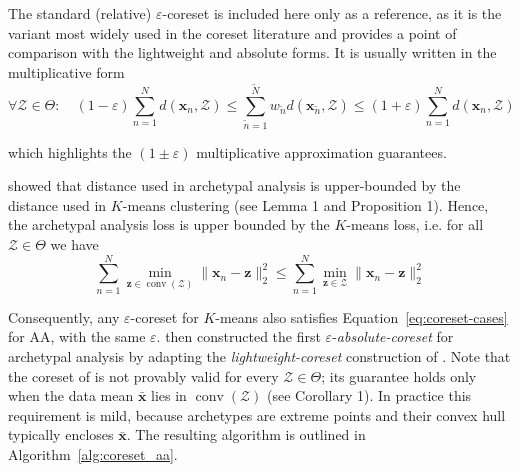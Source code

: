 \documentclass[oneside]{article}
\begin{document}
The standard (relative) $\varepsilon$-coreset is included here only as a reference, as it is the variant most widely used in the coreset literature and provides a point of comparison with the lightweight and absolute forms.  It is usually written in the multiplicative form
\begin{equation}
    \forall \mathcal{Z} \in \Theta: \quad (1-\varepsilon) \sum_{n=1}^N d(\mathbf{x}_n, \mathcal{Z}) \leq \sum_{\tilde{n}=1}^{\tilde{N}} w_{\tilde{n}} d(\mathbf{x}_{\tilde{n}}, \mathcal{Z}) \leq (1+\varepsilon)  \sum_{n=1}^N d(\mathbf{x}_n, \mathcal{Z})
\end{equation}

which highlights the $(1 \pm \varepsilon)$ multiplicative approximation guarantees.

\textcite{mairCoresetsArchetypalAnalysis2019} showed that distance used in archetypal analysis is upper-bounded by the distance used in $K$-means clustering (see Lemma 1 and Proposition 1). Hence, the archetypal analysis loss is upper bounded by the $K$-means loss, i.e. for all $\mathcal{Z} \in \Theta$ we have
\begin{equation}
    \sum_{n=1}^N \min_{\mathbf{z} \in \operatorname{conv}(\mathcal{Z})} \| \mathbf{x}_n - \mathbf{z} \|_2^2 \leq
    \sum_{n=1}^N \min_{\mathbf{z} \in \mathcal{Z}} \| \mathbf{x}_n - \mathbf{z} \|_2^2
\end{equation}

Consequently, any $\varepsilon$-coreset for $K$-means also satisfies Equation~\ref{eq:coreset-cases} for AA, with the same $\varepsilon$. \textcite{mairCoresetsArchetypalAnalysis2019} then constructed the first $\varepsilon$-\emph{absolute-coreset} for archetypal analysis by adapting the \emph{lightweight-coreset} construction of \textcite{bachemScalableMeansClustering2018}. Note that the coreset of \textcite{mairCoresetsArchetypalAnalysis2019} is not provably valid for every $\mathcal{Z}\in\Theta$; its guarantee holds only when the data mean $\bar{\mathbf{x}}$ lies in $\operatorname{conv}(\mathcal Z)$ (see Corollary 1). In practice this requirement is mild, because archetypes are extreme points and their convex hull typically encloses $\bar{\mathbf{x}}$. The resulting algorithm is outlined in Algorithm~\ref{alg:coreset_aa}.
\end{document}

